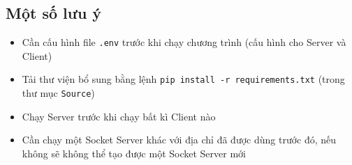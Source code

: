 \documentclass[a4paper,12pt]{report}
\begin{document}
\subsection{Một số lưu ý}
\begin{flushleft}
  \begin{itemize}
    \item Cần cấu hình file \verb|.env| trước khi chạy chương trình (cấu hình cho Server và Client)
    \item Tải thư viện bổ sung bằng lệnh \verb|pip install -r requirements.txt| (trong thư mục \verb|Source|)
    \item Chạy Server trước khi chạy bất kì Client nào
    \item Cần chạy một Socket Server khác với địa chỉ đã được dùng trước đó, nếu không sẽ không thể tạo được một Socket Server mới
  \end{itemize}
\end{flushleft}
\end{document}
